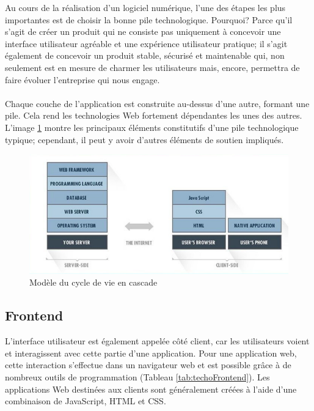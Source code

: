 Au cours de la réalisation d'un logiciel numérique,
        l'une des étapes les plus importantes est de choisir la bonne pile technologique. 
        Pourquoi? Parce qu'il s'agit de créer un produit qui ne consiste pas uniquement
        à concevoir une interface utilisateur agréable et une expérience utilisateur 
        pratique; il s'agit également de concevoir un produit stable, sécurisé et 
        maintenable qui, non seulement est en mesure de charmer les utilisateurs mais, encore,
        permettra de faire évoluer l'entreprise qui nous engage.
        \paragraph{}
        Chaque couche de l'application est construite au-dessus d'une autre, 
        formant une pile. Cela rend les technologies Web fortement dépendantes 
        les unes des autres. L'image \ref{fig:pile} montre les principaux éléments constitutifs 
        d'une pile technologique typique; cependant, il peut y avoir d'autres éléments de 
        soutien impliqués.
        \begin{figure}[t]
                \centering
                \includegraphics[scale=0.5]{images/Implementation/pile.png}
                \caption{Modèle du cycle de vie en cascade \cite{Bulatovych}}
                \label{fig:pile}
        \end{figure}
        \subsection{Frontend}
        L'interface utilisateur est également appelée côté client, car les utilisateurs voient et interagissent 
        avec cette partie d'une application. Pour une application web, cette interaction s'effectue 
        dans un navigateur web et est possible grâce à de nombreux outils de programmation (Tableau \ref{tab:techoFrontend}). 
        Les applications Web destinées aux clients sont généralement créées à l'aide d'une combinaison 
        de JavaScript, HTML et CSS.
